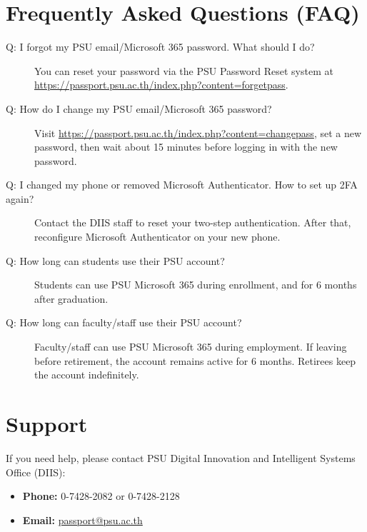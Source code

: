 \documentclass{article}
\begin{document}
\section{Frequently Asked Questions (FAQ)}
\begin{description}
    \item[Q: I forgot my PSU email/Microsoft 365 password. What should I do?] 
    You can reset your password via the PSU Password Reset system at \url{https://passport.psu.ac.th/index.php?content=forgetpass}.
    \item[Q: How do I change my PSU email/Microsoft 365 password?]
    Visit \url{https://passport.psu.ac.th/index.php?content=changepass}, set a new password, then wait about 15 minutes before logging in with the new password.
    \item[Q: I changed my phone or removed Microsoft Authenticator. How to set up 2FA again?] 
    Contact the DIIS staff to reset your two-step authentication. 
    After that, reconfigure Microsoft Authenticator on your new phone.
    \item[Q: How long can students use their PSU account?]
    Students can use PSU Microsoft 365 during enrollment, and for 6 months after graduation.
    \item[Q: How long can faculty/staff use their PSU account?]
    Faculty/staff can use PSU Microsoft 365 during employment. If leaving before retirement, the account remains active for 6 months. Retirees keep the account indefinitely.
\end{description}

\section{Support}
If you need help, please contact PSU Digital Innovation and Intelligent Systems Office (DIIS):
\begin{itemize}
    \item \textbf{Phone:} 0-7428-2082 or 0-7428-2128
    \item \textbf{Email:} \url{passport@psu.ac.th}
\end{itemize}
\end{document}
